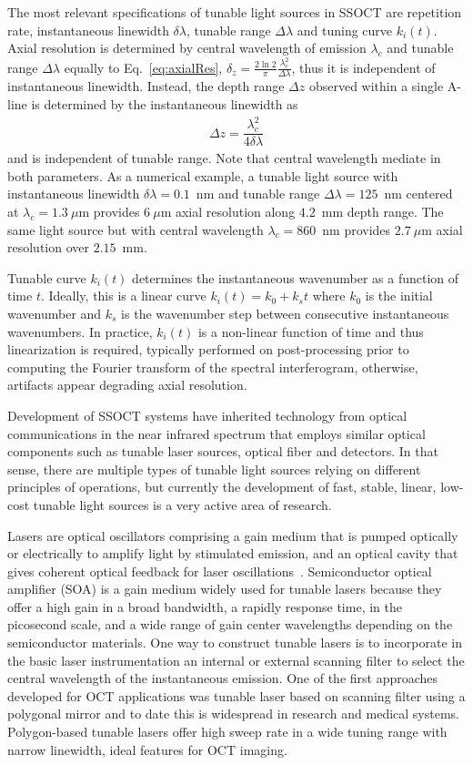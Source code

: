 The most relevant specifications of tunable light sources in SSOCT are repetition rate, instantaneous linewidth $\delta\lambda$, tunable range $\Delta\lambda$ and tuning curve $k_i(t)$. Axial resolution is determined by central wavelength of emission $\lambda_c$ and tunable range $\Delta\lambda$ equally to Eq.~\ref{eq:axialRes}, $\delta_z = \frac{2\ln 2}{\pi}\frac{\lambda_c^2}{\Delta\lambda}$, thus it is independent of instantaneous linewidth. Instead, the depth range $\Delta z$ observed within a single A-line is determined by the instantaneous linewidth as
\begin{align}
\Delta z = \dfrac{\lambda_c^2}{4\delta\lambda}
\end{align}
and is independent of tunable range. Note that central wavelength mediate in both parameters. As a numerical example, a tunable light source with instantaneous linewidth $\delta\lambda=0.1$~nm and tunable range $\Delta\lambda=125$~nm centered at $\lambda_c=1.3~\mu$m provides $6~\mu$m axial resolution along $4.2$~mm depth range. The same light source but with central wavelength $\lambda_c=860$~nm provides $2.7~\mu$m axial resolution over $2.15$~mm.

Tunable curve $k_i(t)$ determines the instantaneous wavenumber as a function of time $t$. Ideally, this is a linear curve $k_i(t) = k_0 + k_st$ where $k_0$ is the initial wavenumber and $k_s$ is the wavenumber step between consecutive instantaneous wavenumbers. In practice, $k_i(t)$ is a non-linear function of time and thus linearization is required, typically performed on post-processing prior to computing the Fourier transform of the spectral interferogram, otherwise, artifacts appear degrading axial resolution.

Development of SSOCT systems have inherited technology from optical communications in the near infrared spectrum that employs similar optical components such as tunable laser sources, optical fiber and detectors. In that sense, there are multiple types of tunable light sources relying on different principles of operations, but currently the development of fast, stable, linear, low-cost tunable light sources is a very active area of research.

Lasers are optical oscillators comprising a gain medium that is pumped optically or electrically to amplify light by stimulated emission, and an optical cavity that gives coherent optical feedback for laser oscillations~\cite{}. Semiconductor optical amplifier (SOA) is a gain medium widely used for tunable lasers because they offer a high gain in a broad bandwidth, a rapidly response time, in the picosecond scale, and a wide range of gain center wavelengths depending on the semiconductor materials. One way to construct tunable lasers is to incorporate in the basic laser instrumentation an internal or external scanning filter to select the central wavelength of the instantaneous emission. One of the first approaches developed for OCT applications was tunable laser based on scanning filter using a polygonal mirror and to date this is widespread in research and medical systems. Polygon-based tunable lasers offer high sweep rate in a wide tuning range with narrow linewidth, ideal features for OCT imaging.


